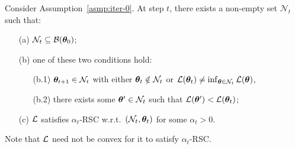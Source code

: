 %
\begin{cond}[{\bf RSC}]
Consider Assumption~\ref{asmp:iter-0}.
At step $t$, 
there exists a non-empty set $\mathcal{N}_t$ 
such that:
\begin{itemize}
\item[(a)] %
$\mathcal{N}_t\subseteq {\cal B}({\bm{\theta}}_0)$;
\item[(b)] one of these two conditions hold:
\begin{itemize}
    \item[(b.1)] ${\bm{\theta}}_{t+1}\in \mathcal{N}_t$ with either ${\bm{\theta}}_{t}\notin \mathcal{N}_t$ or ${\mathcal{L}}({\bm{\theta}}_{t})\neq\inf_{{\bm{\theta}}\in\mathcal{N}_t}{\cal L}({\bm{\theta}})$,\label{condb1} 
    \item[(b.2)] there exists some ${\bm{\theta}}'\in\mathcal{N}_t$ such that ${\cal L}({\bm{\theta}}')<{\cal L}({\bm{\theta}}_{t})$;\label{condb2}
\end{itemize}
\item[(c)] ${\mathcal{L}}$ satisfies $\alpha_t$-RSC w.r.t.~$(\mathcal{N}_t,{\bm{\theta}}_t)$ for some $\alpha_t > 0$.
\end{itemize}
\label{cond:rsc}
\end{cond}

%
Note that ${\mathcal{L}}$ need not be convex for it to satisfy $\alpha_t$-RSC.

